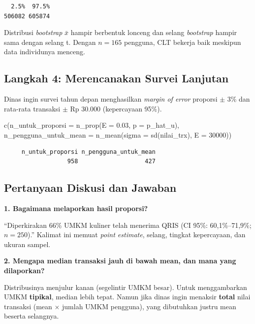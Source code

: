 \documentclass[
  indonesian,
  letterpaper,
]{book}
\newenvironment{Shaded}{\begin{snugshade}}{\end{snugshade}}
\newcommand{\AttributeTok}[1]{\textcolor[rgb]{0.40,0.45,0.13}{#1}}
\newcommand{\DecValTok}[1]{\textcolor[rgb]{0.68,0.00,0.00}{#1}}
\newcommand{\FloatTok}[1]{\textcolor[rgb]{0.68,0.00,0.00}{#1}}
\newcommand{\FunctionTok}[1]{\textcolor[rgb]{0.28,0.35,0.67}{#1}}
\newcommand{\NormalTok}[1]{\textcolor[rgb]{0.00,0.23,0.31}{#1}}
\begin{document}
\begin{verbatim}
  2.5%  97.5% 
506082 605874 
\end{verbatim}

Distribusi \emph{bootstrap} \(\bar{x}\) hampir berbentuk lonceng dan
selang \emph{bootstrap} hampir sama dengan selang t. Dengan \(n = 165\)
pengguna, CLT bekerja baik meskipun data individunya menceng.

\subsection{Langkah 4: Merencanakan Survei
Lanjutan}\label{langkah-4-merencanakan-survei-lanjutan}

Dinas ingin survei tahun depan menghasilkan \emph{margin of error}
proporsi \(\pm\) 3\% dan rata-rata transaksi \(\pm\) Rp 30.000
(kepercayaan 95\%).

\begin{Shaded}
\begin{Highlighting}[]
\FunctionTok{c}\NormalTok{(}\AttributeTok{n\_untuk\_proporsi =} \FunctionTok{n\_prop}\NormalTok{(}\AttributeTok{E =} \FloatTok{0.03}\NormalTok{, }\AttributeTok{p =}\NormalTok{ p\_hat\_u),}
  \AttributeTok{n\_pengguna\_untuk\_mean =} \FunctionTok{n\_mean}\NormalTok{(}\AttributeTok{sigma =} \FunctionTok{sd}\NormalTok{(nilai\_trx), }\AttributeTok{E =} \DecValTok{30000}\NormalTok{))}
\end{Highlighting}
\end{Shaded}

\begin{verbatim}
     n_untuk_proporsi n_pengguna_untuk_mean 
                  958                   427 
\end{verbatim}

\subsection{Pertanyaan Diskusi dan
Jawaban}\label{pertanyaan-diskusi-dan-jawaban}

\textbf{1. Bagaimana melaporkan hasil proporsi?}

``Diperkirakan 66\% UMKM kuliner telah menerima QRIS (CI 95\%:
60,1\%--71,9\%; \(n = 250\)).'' Kalimat ini memuat \emph{point
estimate}, selang, tingkat kepercayaan, dan ukuran sampel.

\textbf{2. Mengapa median transaksi jauh di bawah mean, dan mana yang
dilaporkan?}

Distribusinya menjulur kanan (segelintir UMKM besar). Untuk
menggambarkan UMKM \textbf{tipikal}, median lebih tepat. Namun jika
dinas ingin menaksir \textbf{total} nilai transaksi (mean \(\times\)
jumlah UMKM pengguna), yang dibutuhkan justru mean beserta selangnya.
\end{document}
